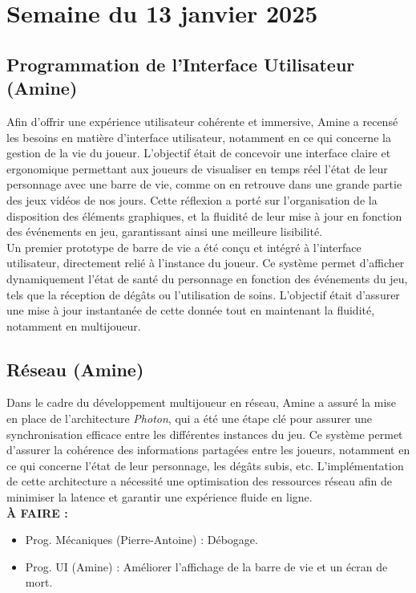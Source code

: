 \documentclass{report}
\begin{document}
\newpage
\section{Semaine du 13 janvier 2025}

\subsection*{Programmation de l'Interface Utilisateur (Amine)}
Afin d’offrir une expérience utilisateur cohérente et immersive, Amine a recensé les besoins en matière d’interface utilisateur, notamment en ce qui concerne la gestion de la vie du joueur. L’objectif était de concevoir une interface claire et ergonomique permettant aux joueurs de visualiser en temps réel l’état de leur personnage avec une barre de vie, comme on en retrouve dans une grande partie des jeux vidéos de nos jours. Cette réflexion a porté sur l'organisation de la disposition des éléments graphiques, et la fluidité de leur mise à jour en fonction des événements en jeu, garantissant ainsi une meilleure lisibilité.
\\[0.4cm]
Un premier prototype de barre de vie a été conçu et intégré à l’interface utilisateur, directement relié à l’instance du joueur. Ce système permet d’afficher dynamiquement l’état de santé du personnage en fonction des événements du jeu, tels que la réception de dégâts ou l’utilisation de soins. L’objectif était d’assurer une mise à jour instantanée de cette donnée tout en maintenant la fluidité, notamment en multijoueur.

\subsection*{Réseau (Amine)}
Dans le cadre du développement multijoueur en réseau, Amine a assuré la mise en place de l’architecture \textit{Photon}, qui a été une étape clé pour assurer une synchronisation efficace entre les différentes instances du jeu. Ce système permet d’assurer la cohérence des informations partagées entre les joueurs, notamment en ce qui concerne l’état de leur personnage, les dégâts subis, etc. L’implémentation de cette architecture a nécessité une optimisation des ressources réseau afin de minimiser la latence et garantir une expérience fluide en ligne.
\\[1cm]
\textbf{À FAIRE :}
\begin{itemize}
    \item Prog. Mécaniques (Pierre-Antoine) : Débogage.
    \item Prog. UI (Amine) : Améliorer l'affichage de la barre de vie et un écran de mort.
\end{itemize}
\end{document}
